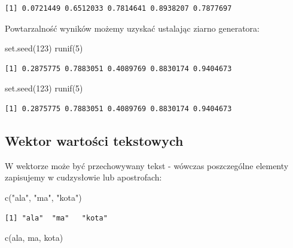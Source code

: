 \documentclass[
  letterpaper,
  DIV=11,
  numbers=noendperiod]{scrreprt}
\newenvironment{Shaded}{\begin{snugshade}}{\end{snugshade}}
\newcommand{\DecValTok}[1]{\textcolor[rgb]{0.68,0.00,0.00}{#1}}
\newcommand{\FunctionTok}[1]{\textcolor[rgb]{0.28,0.35,0.67}{#1}}
\newcommand{\NormalTok}[1]{\textcolor[rgb]{0.00,0.23,0.31}{#1}}
\newcommand{\StringTok}[1]{\textcolor[rgb]{0.13,0.47,0.30}{#1}}
\begin{document}
\begin{verbatim}
[1] 0.0721449 0.6512033 0.7814641 0.8938207 0.7877697
\end{verbatim}

Powtarzalność wyników możemy uzyskać ustalając ziarno generatora:

\begin{Shaded}
\begin{Highlighting}[]
\FunctionTok{set.seed}\NormalTok{(}\DecValTok{123}\NormalTok{)}
\FunctionTok{runif}\NormalTok{(}\DecValTok{5}\NormalTok{)}
\end{Highlighting}
\end{Shaded}

\begin{verbatim}
[1] 0.2875775 0.7883051 0.4089769 0.8830174 0.9404673
\end{verbatim}

\begin{Shaded}
\begin{Highlighting}[]
\FunctionTok{set.seed}\NormalTok{(}\DecValTok{123}\NormalTok{)}
\FunctionTok{runif}\NormalTok{(}\DecValTok{5}\NormalTok{)}
\end{Highlighting}
\end{Shaded}

\begin{verbatim}
[1] 0.2875775 0.7883051 0.4089769 0.8830174 0.9404673
\end{verbatim}

\hypertarget{wektor-wartoux15bci-tekstowych}{%
\subsection{Wektor wartości
tekstowych}\label{wektor-wartoux15bci-tekstowych}}

W wektorze może być przechowywany tekst - wówczas poszczególne elementy
zapisujemy w cudzysłowie lub apostrofach:

\begin{Shaded}
\begin{Highlighting}[]
\FunctionTok{c}\NormalTok{(}\StringTok{"ala"}\NormalTok{, }\StringTok{"ma"}\NormalTok{, }\StringTok{"kota"}\NormalTok{)}
\end{Highlighting}
\end{Shaded}

\begin{verbatim}
[1] "ala"  "ma"   "kota"
\end{verbatim}

\begin{Shaded}
\begin{Highlighting}[]
\FunctionTok{c}\NormalTok{(}\StringTok{\textquotesingle{}ala\textquotesingle{}}\NormalTok{, }\StringTok{\textquotesingle{}ma\textquotesingle{}}\NormalTok{, }\StringTok{\textquotesingle{}kota\textquotesingle{}}\NormalTok{)}
\end{Highlighting}
\end{Shaded}
\end{document}
